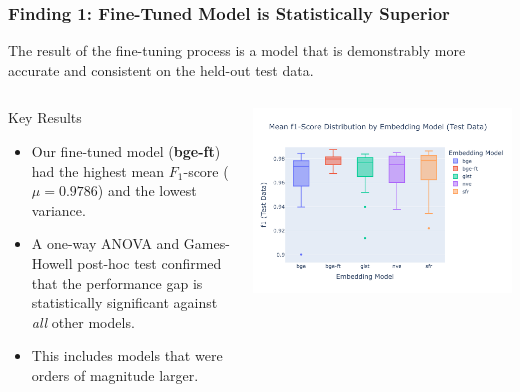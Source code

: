 \documentclass[aspectratio=169,10pt]{beamer}
\begin{document}
\begin{frame}
    \frametitle{Finding 1: Fine-Tuned Model is Statistically Superior}
    
    The result of the fine-tuning process is a model that is demonstrably more accurate and consistent on the held-out test data.
    
    \begin{columns}[T]
        \begin{column}{0.35\textwidth}
            \begin{block}{Key Results}
                \begin{itemize}
                    \item Our fine-tuned model (\textbf{bge-ft}) had the highest mean \(F_1\)-score (\(\mu=0.9786\)) and the lowest variance.
                    \item A one-way ANOVA and Games-Howell post-hoc test confirmed that the performance gap is statistically significant against \emph{all} other models.
                    \item This includes models that were orders of magnitude larger.
                \end{itemize}
            \end{block}
        \end{column}
        
        \begin{column}{0.55\textwidth}
            \centering
            \includegraphics[width=\textwidth]{embeddingmodel_f1score_boxplot_test.pdf}
        \end{column}
    \end{columns}
    
\end{frame}
\end{document}
